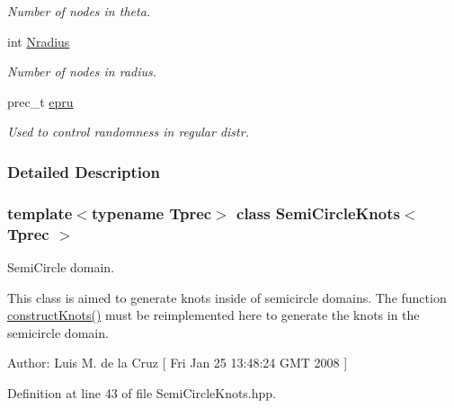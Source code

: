 \begin{CompactItemize}
\begin{CompactList}\small\item\em Number of nodes in theta. \item\end{CompactList}\item 
\hypertarget{classSemiCircleKnots_8a89ba2b67cee1ba0217a43df21203d6}{
int \hyperlink{classSemiCircleKnots_8a89ba2b67cee1ba0217a43df21203d6}{Nradius}}
\label{classSemiCircleKnots_8a89ba2b67cee1ba0217a43df21203d6}

\begin{CompactList}\small\item\em Number of nodes in radius. \item\end{CompactList}\item 
\hypertarget{classSemiCircleKnots_de03c42c61adb8d3c935511acf38c740}{
prec\_\-t \hyperlink{classSemiCircleKnots_de03c42c61adb8d3c935511acf38c740}{epru}}
\label{classSemiCircleKnots_de03c42c61adb8d3c935511acf38c740}

\begin{CompactList}\small\item\em Used to control randomness in regular distr. \item\end{CompactList}\end{CompactItemize}


\subsubsection{Detailed Description}
\subsubsection*{template$<$typename Tprec$>$ class SemiCircleKnots$<$ Tprec $>$}

SemiCircle domain. 

This class is aimed to generate knots inside of semicircle domains. The function \hyperlink{classSemiCircleKnots_af1e7ded0e5a9ed35d61a1ae63621b6d}{constructKnots()} must be reimplemented here to generate the knots in the semicircle domain. \begin{Desc}
\item[Author:]Luis M. de la Cruz \mbox{[} Fri Jan 25 13:48:24 GMT 2008 \mbox{]} \end{Desc}


Definition at line 43 of file SemiCircleKnots.hpp.

